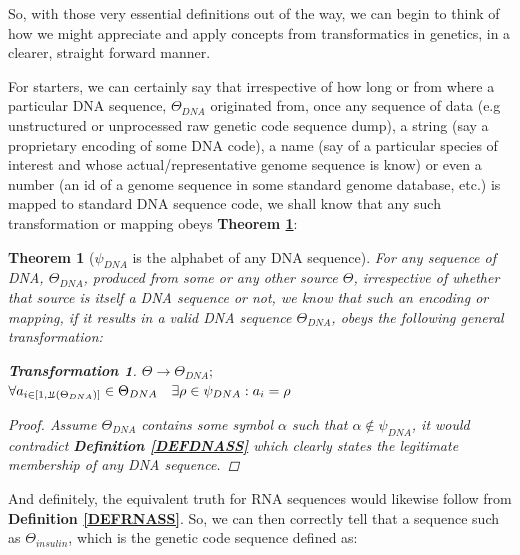 \documentclass[a4paper, 18pt]{book} %
\newtheorem{theo}{Theorem}
\newtheorem{trans}{Transformation}
\newcommand{\invpi}{\rotatebox[origin=c]{180}{$\pi$}}
\begin{document}
So, with those very essential definitions out of the way, we can begin to think of how we might appreciate and apply concepts from transformatics in genetics, in a clearer, straight forward manner.

For starters, we can certainly say that irrespective of how long or from where a particular DNA sequence, $\Theta_{DNA}$ originated from, once any sequence of data (e.g unstructured or unprocessed raw genetic code sequence dump), a string (say a proprietary encoding of some DNA code), a name (say of a particular species of interest and whose actual/representative genome sequence is know) or even a number (an id of a genome sequence in some standard genome database, etc.) is mapped to standard DNA sequence code, we shall know that any such transformation or mapping obeys \textbf{Theorem \ref{THEODNA}}:

\begin{theo}[$\psi_{DNA}$ is the alphabet of any DNA sequence]
\label{THEODNA}
For any sequence of DNA, $\Theta_{DNA}$, produced from some or any other source $\Theta$, irrespective of whether that source is itself a DNA sequence or not, we know that such an encoding or mapping, if it results in a valid DNA sequence $\Theta_{DNA}$, obeys the following general transformation:\\

\begin{trans}
\label{TRANSmDNA}
$\Theta \rightarrow \Theta_{DNA};$\\
$\forall a_{i \in [1,\invpi(\Theta_{DNA})]} \in \Theta_{DNA} \quad \exists \rho \in \psi_{DNA}: a_i = \rho$
\end{trans}

\begin{proof}
Assume $\Theta_{DNA}$ contains some symbol $\alpha$ such that $\alpha \not\in \psi_{DNA}$, it would contradict \textbf{Definition \ref{DEFDNASS}} which clearly states the legitimate membership of any DNA sequence.
\end{proof}

\end{theo}


And definitely, the equivalent truth for RNA sequences would likewise follow from \textbf{Definition \ref{DEFRNASS}}. So, we can then correctly tell that a sequence such as $\Theta_{insulin}$, which is the genetic code sequence defined as:\\
\end{document}
